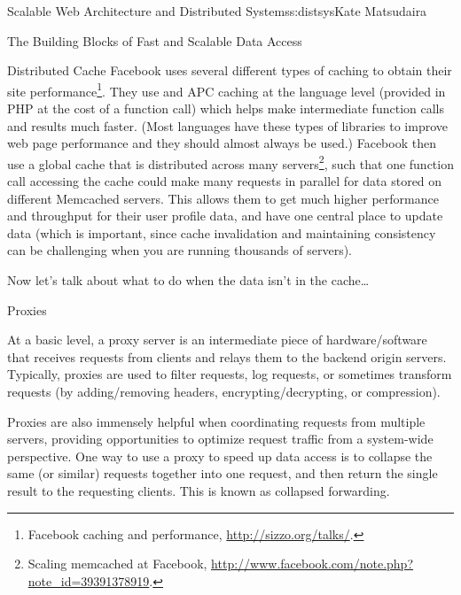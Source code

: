 \begin{aosachapter}{Scalable Web Architecture and Distributed Systems}{s:distsys}{Kate Matsudaira}
\begin{aosasect1}{The Building Blocks of Fast and Scalable Data Access}
\begin{aosasect2}{Distributed Cache}
Facebook uses several different types of caching to
obtain their site performance\footnote{Facebook caching and
performance, \url{http://sizzo.org/talks/}.}. They use  and
APC caching at the language level (provided in PHP at the cost of a function call) which helps make intermediate
function calls and results much faster. (Most languages have these
types of libraries to improve web page performance and they should almost
always be used.) Facebook then use a global cache that is
distributed across many servers\footnote{Scaling memcached at
  Facebook,
  \url{http://www.facebook.com/note.php?note_id=39391378919}.}, such
that one function call accessing the cache could make many requests in
parallel for data stored on different Memcached servers. This allows
them to get much higher performance and throughput for their user
profile data, and have one central place to update data (which is
important, since cache invalidation and maintaining consistency can be
challenging when you are running thousands of servers).

Now let's talk about what to do when the data isn't in the cache{\ldots}

\end{aosasect2}

\begin{aosasect2}{Proxies}

At a basic level, a proxy server is an intermediate piece of
hardware/software that receives requests from clients and relays them
to the backend origin servers. Typically, proxies are used to filter
requests, log requests, or sometimes transform requests (by
adding/removing headers, encrypting/decrypting, or compression).


Proxies are also immensely helpful when coordinating requests from
multiple servers, providing opportunities to optimize request traffic
from a system-wide perspective. One way to use a proxy to speed up
data access is to collapse the same (or similar) requests together
into one request, and then return the single result to the requesting
clients. This is known as collapsed forwarding.


\end{aosasect2}
\end{aosasect1}
\end{aosachapter}
